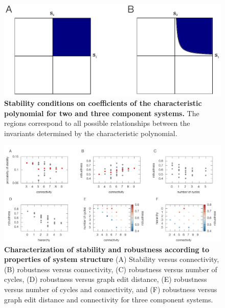\pagebreak

\begin{figure}[!ht]
\centering
\noindent\includegraphics[width=0.5\columnwidth]{fig/region2and3.pdf}
\caption{{\bf Stability conditions on coefficients of the characteristic polynomial for two and three component systems.} The regions correspond to all possible relationships between the invariants determined by the characteristic polynomial.}
\label{fig:region2and3}
\end{figure}

\pagebreak

\begin{figure}[!ht]
\centering
\noindent\includegraphics[width=1.0\columnwidth]{fig/combinedfigs.pdf}
\caption{{\bf Characterization of stability and robustness according to properties of system structure} (A) Stability versus connectivity, (B) robustness versus connectivity, (C) robustness versus number of cycles, (D) robustness versus graph edit distance, (E) robustness versus number of cycles and connectivity, and (F) robustness versus graph edit distance and connectivity for three component systems.}
\label{fig:combined}
\end{figure}



